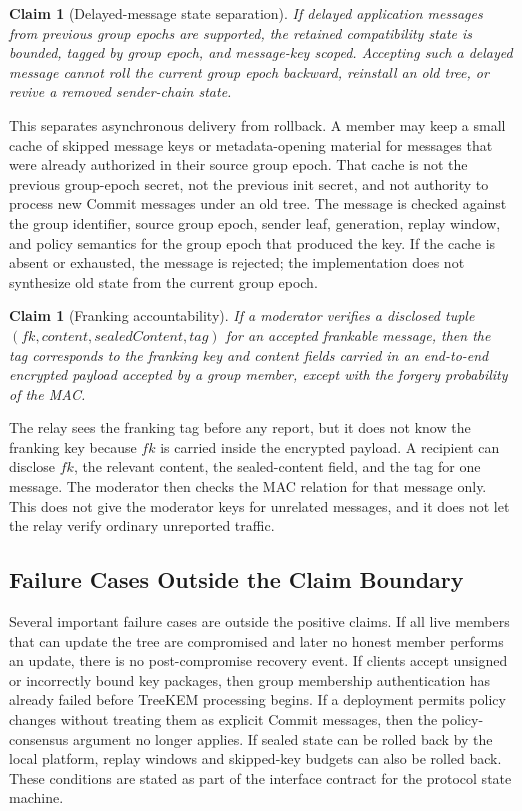 \documentclass[preprint,12pt]{elsarticle}
\newtheorem{claim}[theorem]{Claim}
\theoremstyle{definition}
\begin{document}
\begin{claim}[Delayed-message state separation]
If delayed application messages from previous group epochs are supported, the retained
compatibility state is bounded, tagged by group epoch, and message-key scoped. Accepting
such a delayed message cannot roll the current group epoch backward, reinstall
an old tree, or revive a removed sender-chain state.
\end{claim}

\noindent
This separates asynchronous delivery from rollback. A member may keep a small
cache of skipped message keys or metadata-opening material for messages that
were already authorized in their source group epoch. That cache is not the previous
group-epoch secret, not the previous init secret, and not authority to process new
Commit messages under an old tree. The message is checked against the group identifier,
source group epoch, sender leaf, generation, replay window, and policy semantics for
the group epoch that produced the key. If the cache is absent or exhausted, the
message is rejected; the implementation does not synthesize old state from the
current group epoch.

\begin{claim}[Franking accountability]
If a moderator verifies a disclosed tuple
$(fk,\mathit{content},\mathit{sealedContent},\mathit{tag})$ for an accepted
frankable message, then the tag corresponds to the franking key and content
fields carried in an end-to-end encrypted payload accepted by a group member,
except with the forgery probability of the MAC.
\end{claim}

\noindent
The relay sees the franking tag before any report, but it does not know the
franking key because $fk$ is carried inside the encrypted payload. A recipient
can disclose $fk$, the relevant content, the sealed-content field, and the tag
for one message. The moderator then checks the MAC relation for that message
only. This does not give the moderator keys for unrelated messages, and it does
not let the relay verify ordinary unreported traffic.

\subsection{Failure Cases Outside the Claim Boundary}

Several important failure cases are outside the positive claims.
If all live members that can update the tree are compromised and later no
honest member performs an update, there is no post-compromise recovery event.
If clients accept unsigned or incorrectly bound key packages, then group
membership authentication has already failed before TreeKEM processing begins.
If a deployment permits policy changes without treating them as explicit
Commit messages, then the policy-consensus argument no longer applies. If
sealed state can be rolled back by the local platform, replay windows and
skipped-key budgets can also be rolled back. These conditions are stated as
part of the interface contract for the protocol state machine.
\end{document}

